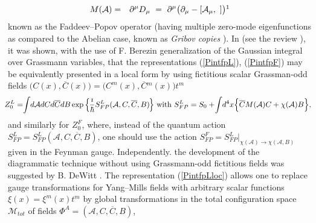 \documentclass[10pt]{article}
\begin{document}
\begin{eqnarray} \label{operatorFP}
M(\mathcal{A})    & =& \partial^\mu D_{\mu} \ = \    \partial^\mu \big(\partial_\mu -  [\mathcal{A}_\mu,    \ ] \big)\footnotemark
 \end{eqnarray}known as the Faddeev--Popov operator (having multiple zero-mode eigenfunctions
as compared to the Abelian case, known as \emph{Gribov copies}  \cite{Gribov}).
In \cite{fp-ghosts} (see the review \cite{faddeev}), it was shown, with the use
of F. Berezin \cite{berezin} generalization of the Gaussian integral over Grassmann variables, that the representations (\ref{PintfpL}), (\ref{PintfpF}) may be equivalently presented in a local form by using fictitious scalar Grassman-odd fields $\big(C(x), \overline{C}(x)\big)=\big(C^m(x), \overline{C}{}^m(x)\big)t^m$
\begin{eqnarray}\label{PintfpLloc}
 &\hspace{-1em}&\hspace{-0.5em} Z^L_{0} =  \hspace{-0.3em}\int \hspace{-0.2em} d \mathcal{A}d C d \overline{C} dB \exp \Big\{\hspace{-0.1em}\frac{\imath}{\hbar}S^L_{FP}(\mathcal{A},C, \overline{C}, B)\hspace{-0.1em}\Big\} \ \mathrm{with}  \ S^L_{FP}  =  S_0+ \hspace{-0.2em}\int \hspace{-0.2em}d^4x \Big\{\overline{C}M(\mathcal{A})C+\chi( \mathcal{A})B\Big\},
\end{eqnarray}
and similarly for $Z^F_0$,  where, instead of the quantum action $S^L_{FP}=S^L_{FP}(\mathcal{A},C, \overline{C}, B)$, one should
use the action $S^F_{FP}=S^L_{FP}\big|_{\chi( \mathcal{A})\to\chi( \mathcal{A},B)}$ given
in the Feynman gauge. Independently. the development of the diagrammatic technique without using Grassmann-odd fictitious fields was suggested by B. DeWitt \cite{dewitt}.     The representation (\ref{PintfpLloc}) allows one to replace gauge
transformations for Yang--Mills fields with arbitrary scalar functions $\xi(x)=\xi^m(x)t^m$
by global transformations in the total configuration space
$\mathcal{M}_{tot}$ of fields $\Phi^A = (\mathcal{A},C, \overline{C}, B)$,
\end{document}
